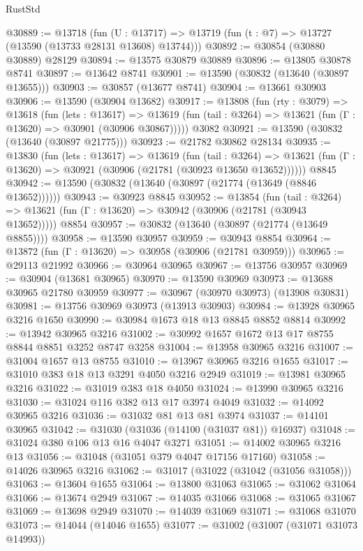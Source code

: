 \begin{lexlean}{RustStd}
\begin{coremodule}
@30889 := @13718
    (fun (U : @13717) => @13719 (fun (t : @7) => @13727 (@13590 (@13733 @28131 @13608) @13744)))
@30892 := @30854 (@30880 @30889) @28129
@30894 := @13575 @30879 @30889
@30896 := @13805 @30878 @8741
@30897 := @13642 @8741
@30901 := @13590 (@30832 (@13640 (@30897 @13655)))
@30903 := @30857 (@13677 @8741)
@30904 := @13661 @30903
@30906 := @13590 (@30904 @13682)
@30917 := @13808
    (fun (rty : @3079) =>
    @13618
      (fun (lets : @13617) =>
      @13619 (fun (tail : @3264) => @13621 (fun (Γ : @13620) => @30901 (@30906 @30867)))))
    @3082
@30921 := @13590 (@30832 (@13640 (@30897 @21775)))
@30923 := @21782 @30862 @28134
@30935 := @13830
    (fun (lets : @13617) =>
    @13619
      (fun (tail : @3264) =>
      @13621 (fun (Γ : @13620) => @30921 (@30906 (@21781 (@30923 @13650 @13652))))))
    @8845
@30942 := @13590 (@30832 (@13640 (@30897 (@21774 (@13649 (@8846 @13652))))))
@30943 := @30923 @8845
@30952 := @13854
    (fun (tail : @3264) => @13621 (fun (Γ : @13620) => @30942 (@30906 (@21781 (@30943 @13652)))))
    @8854
@30957 := @30832 (@13640 (@30897 (@21774 (@13649 @8855))))
@30958 := @13590 @30957
@30959 := @30943 @8854
@30964 := @13872 (fun (Γ : @13620) => @30958 (@30906 (@21781 @30959)))
@30965 := @29113 @21992
@30966 := @30964 @30965
@30967 := @13756 @30957
@30969 := @30904 (@13681 @30965)
@30970 := @13590 @30969
@30973 := @13688 @30965 @21780 @30959
@30977 := @30967 (@30970 @30973) (@13908 @30831)
@30981 := @13756 @30969 @30973 (@13913 @30903)
@30984 := @13928 @30965 @3216 @1650
@30990 := @30984 @1673 @18 @13 @8845 @8852 @8814
@30992 := @13942 @30965 @3216
@31002 := @30992 @1657 @1672 @13 @17 @8755 @8844 @8851 @3252 @8747 @3258
@31004 := @13958 @30965 @3216
@31007 := @31004 @1657 @13 @8755
@31010 := @13967 @30965 @3216 @1655
@31017 := @31010 @383 @18 @13 @3291 @4050 @3216 @2949
@31019 := @13981 @30965 @3216
@31022 := @31019 @383 @18 @4050
@31024 := @13990 @30965 @3216
@31030 := @31024 @116 @382 @13 @17 @3974 @4049
@31032 := @14092 @30965 @3216
@31036 := @31032 @81 @13 @81 @3974
@31037 := @14101 @30965
@31042 := @31030 (@31036 (@14100 (@31037 @81)) @16937)
@31048 := @31024 @380 @106 @13 @16 @4047 @3271
@31051 := @14002 @30965 @3216 @13
@31056 := @31048 (@31051 @379 @4047 @17156 @17160)
@31058 := @14026 @30965 @3216
@31062 := @31017 (@31022 (@31042 (@31056 @31058)))
@31063 := @13604 @1655
@31064 := @13800 @31063
@31065 := @31062 @31064
@31066 := @13674 @2949
@31067 := @14035 @31066
@31068 := @31065 @31067
@31069 := @13698 @2949
@31070 := @14039 @31069
@31071 := @31068 @31070
@31073 := @14044 (@14046 @1655)
@31077 := @31002 (@31007 (@31071 @31073 @14993))

\end{coremodule}
\end{lexlean}
